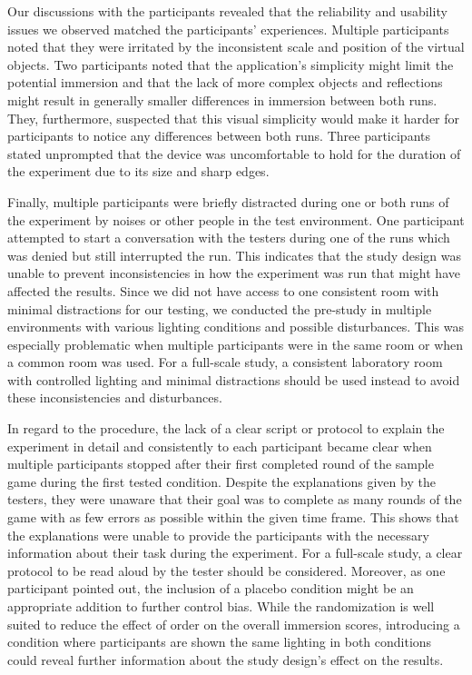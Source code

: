 \documentclass[12pt,twoside,english]{article}
\begin{document}
Our discussions with the participants revealed that the reliability and usability issues we observed matched the participants' experiences.
Multiple participants noted that they were irritated by the inconsistent scale and position of the virtual objects.
Two participants noted that the application's simplicity might limit the potential immersion and that the lack of more complex objects and reflections might result in generally smaller differences in immersion between both runs.
They, furthermore, suspected that this visual simplicity would make it harder for participants to notice any differences between both runs.
Three participants stated unprompted that the device was uncomfortable to hold for the duration of the experiment due to its size and sharp edges.

Finally, multiple participants were briefly distracted during one or both runs of the experiment by noises or other people in the test environment.
One participant attempted to start a conversation with the testers during one of the runs which was denied but still interrupted the run.
This indicates that the study design was unable to prevent inconsistencies in how the experiment was run that might have affected the results.
Since we did not have access to one consistent room with minimal distractions for our testing, we conducted the pre-study in multiple environments with various lighting conditions and possible disturbances.
This was especially problematic when multiple participants were in the same room or when a common room was used.
For a full-scale study, a consistent laboratory room with controlled lighting and minimal distractions should be used instead to avoid these inconsistencies and disturbances.

In regard to the procedure, the lack of a clear script or protocol to explain the experiment in detail and consistently to each participant became clear when multiple participants stopped after their first completed round of the sample game during the first tested condition.
Despite the explanations given by the testers, they were unaware that their goal was to complete as many rounds of the game with as few errors as possible within the given time frame.
This shows that the explanations were unable to provide the participants with the necessary information about their task during the experiment.
For a full-scale study, a clear protocol to be read aloud by the tester should be considered.
Moreover, as one participant pointed out, the inclusion of a placebo condition might be an appropriate addition to further control bias.
While the randomization is well suited to reduce the effect of order on the overall immersion scores, introducing a condition where participants are shown the same lighting in both conditions could reveal further information about the study design's effect on the results.
\end{document}
